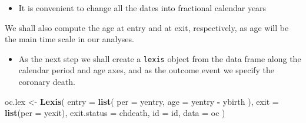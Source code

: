 \documentclass[
]{book}
\newenvironment{Shaded}{\begin{snugshade}}{\end{snugshade}}
\newcommand{\AttributeTok}[1]{\textcolor[rgb]{0.13,0.29,0.53}{#1}}
\newcommand{\FunctionTok}[1]{\textcolor[rgb]{0.13,0.29,0.53}{\textbf{#1}}}
\newcommand{\NormalTok}[1]{#1}
\newcommand{\OtherTok}[1]{\textcolor[rgb]{0.56,0.35,0.01}{#1}}
\newcommand{\SpecialCharTok}[1]{\textcolor[rgb]{0.81,0.36,0.00}{\textbf{#1}}}
\providecommand{\tightlist}{%
  \setlength{\itemsep}{0pt}\setlength{\parskip}{0pt}}
\theoremstyle{definition}
\theoremstyle{definition}
\theoremstyle{definition}
\theoremstyle{definition}
\theoremstyle{remark}
\begin{document}
\begin{itemize}
\tightlist
\item
  It is convenient to change all the dates into fractional calendar years
\end{itemize}

\begin{Shaded}
\end{Shaded}

We shall also compute the age at entry and at exit, respectively,
as age will be the main time scale in our analyses.

\begin{Shaded}
\end{Shaded}

\begin{itemize}
\tightlist
\item
  As the next step we shall create a \texttt{lexis} object
  from the data frame along the calendar period and age axes,
  and as the outcome event we specify the coronary death.
\end{itemize}

\begin{Shaded}
\begin{Highlighting}[]
\NormalTok{oc.lex }\OtherTok{\textless{}{-}} \FunctionTok{Lexis}\NormalTok{(}
  \AttributeTok{entry =} \FunctionTok{list}\NormalTok{(}
    \AttributeTok{per =}\NormalTok{ yentry,}
    \AttributeTok{age =}\NormalTok{ yentry }\SpecialCharTok{{-}}\NormalTok{ ybirth}
\NormalTok{  ),}
  \AttributeTok{exit =} \FunctionTok{list}\NormalTok{(}\AttributeTok{per =}\NormalTok{ yexit),}
  \AttributeTok{exit.status =}\NormalTok{ chdeath,}
  \AttributeTok{id =}\NormalTok{ id, }\AttributeTok{data =}\NormalTok{ oc}
\NormalTok{)}
\end{Highlighting}
\end{Shaded}
\end{document}
